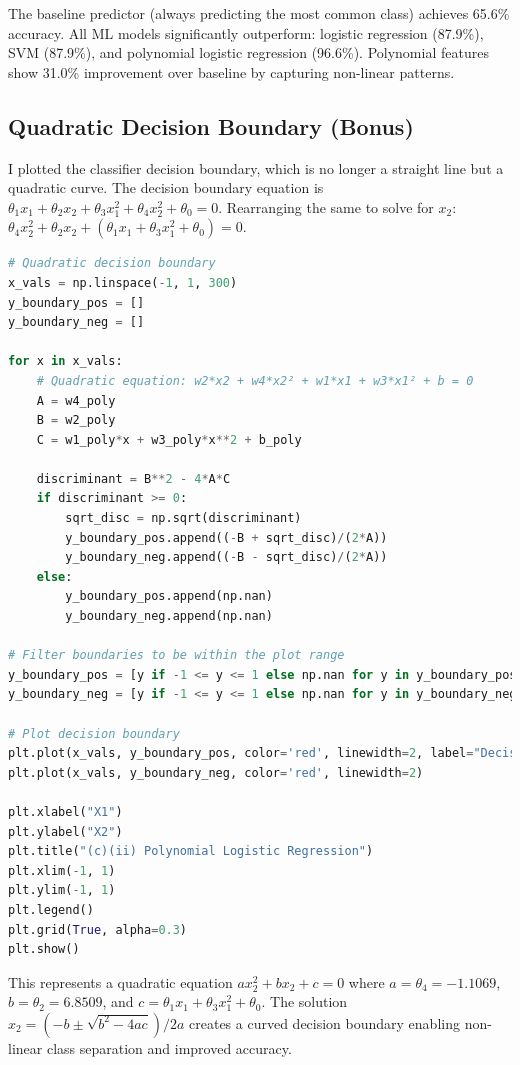 \documentclass[12pt,a4paper]{article}
\begin{document}
The baseline predictor (always predicting the most common class) achieves 65.6\% accuracy. All ML models significantly outperform: logistic regression (87.9\%), SVM (87.9\%), and polynomial logistic regression (96.6\%). Polynomial features show 31.0\% improvement over baseline by capturing non-linear patterns.

\subsection{Quadratic Decision Boundary (Bonus)}

I plotted the classifier decision boundary, which is no longer a straight line but a quadratic curve. The decision boundary equation is $\theta_1 x_1 + \theta_2 x_2 + \theta_3 x_1^2 + \theta_4 x_2^2 + \theta_0 = 0$. Rearranging the same to solve for $x_2$: $\theta_4 x_2^2 + \theta_2 x_2 + (\theta_1 x_1 + \theta_3 x_1^2 + \theta_0) = 0$.

\begin{lstlisting}[language=Python, caption={Quadratic decision boundary}]
# Quadratic decision boundary
x_vals = np.linspace(-1, 1, 300)
y_boundary_pos = []
y_boundary_neg = []

for x in x_vals:
    # Quadratic equation: w2*x2 + w4*x2² + w1*x1 + w3*x1² + b = 0
    A = w4_poly
    B = w2_poly
    C = w1_poly*x + w3_poly*x**2 + b_poly
    
    discriminant = B**2 - 4*A*C
    if discriminant >= 0:
        sqrt_disc = np.sqrt(discriminant)
        y_boundary_pos.append((-B + sqrt_disc)/(2*A))
        y_boundary_neg.append((-B - sqrt_disc)/(2*A))
    else:
        y_boundary_pos.append(np.nan)
        y_boundary_neg.append(np.nan)

# Filter boundaries to be within the plot range
y_boundary_pos = [y if -1 <= y <= 1 else np.nan for y in y_boundary_pos]
y_boundary_neg = [y if -1 <= y <= 1 else np.nan for y in y_boundary_neg]

# Plot decision boundary
plt.plot(x_vals, y_boundary_pos, color='red', linewidth=2, label="Decision Boundary")
plt.plot(x_vals, y_boundary_neg, color='red', linewidth=2)

plt.xlabel("X1")
plt.ylabel("X2")
plt.title("(c)(ii) Polynomial Logistic Regression")
plt.xlim(-1, 1)
plt.ylim(-1, 1)
plt.legend()
plt.grid(True, alpha=0.3)
plt.show()
\end{lstlisting}

This represents a quadratic equation $ax_2^2 + bx_2 + c = 0$ where $a = \theta_4 = -1.1069$, $b = \theta_2 = 6.8509$, and $c = \theta_1 x_1 + \theta_3 x_1^2 + \theta_0$. The solution $x_2 = (-b \pm \sqrt{b^2 - 4ac}) / 2a$ creates a curved decision boundary enabling non-linear class separation and improved accuracy.
\end{document}
